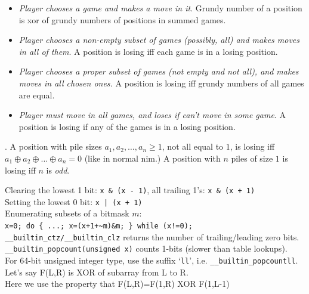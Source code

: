 \vspace{-2mm}
\begin{itemize}
  \item
    \emph{Player chooses a game and makes a move in it}.
    Grundy number of a position is xor of grundy numbers of positions in summed games.
  \item
    \emph{Player chooses a non-empty subset of games (possibly, all) and makes moves in all of them}.
    A position is losing iff each game is in a losing position.
  \item
    \emph{Player chooses a proper subset of games (not empty and not all),
        and makes moves in all chosen ones.}
    A position is losing iff grundy numbers of all games are equal.
  \item
    \emph{Player must move in all games, and loses if can't move in some game}.
    A position is losing if any of the games is in a losing position.
\end{itemize}

\vspace{-3mm}
.
A position with pile sizes $a_1, a_2, \dots, a_n \ge 1$,
not all equal to $1$, is losing iff $a_1 \oplus a_2 \oplus \dots \oplus a_n = 0$
(like in normal nim.)
A position with $n$ piles of size $1$ is losing iff $n$ is \emph{odd}.



Clearing the lowest 1 bit: \verb$x & (x - 1)$, all trailing 1's: \verb$x & (x + 1)$ \\
Setting the lowest 0 bit: \verb$x | (x + 1)$ \\
Enumerating subsets of a bitmask $m$: \\
\verb|x=0; do { ...; x=(x+1+~m)&m; } while (x!=0);| \\
\verb$__builtin_ctz/__builtin_clz$ returns the number of trailing/leading zero bits. \\
\verb$__builtin_popcount(unsigned x)$ counts 1-bits (slower than table lookups). \\
For 64-bit unsigned integer type, use the suffix `\verb$ll$', i.e. \verb$__builtin_popcountll$. \TopicBreak
{}
Let's say F(L,R) is XOR of subarray from L to R.\\
Here we use the property that F(L,R)=F(1,R) XOR F(1,L-1)



